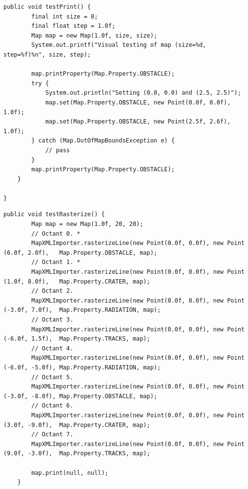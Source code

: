 \documentclass[12pt,a4paper]{article}
\begin{document}
     \begin{lstlisting}[caption=Map automated test suite 3, captionpos=b, label={lst:MapAutomatedTestSuite3}]
      public void testPrint() {
        final int size = 8;
        final float step = 1.0f;
        Map map = new Map(1.0f, size, size);
        System.out.printf("Visual testing of map (size=%d, step=%f)%n", size, step);
        
        map.printProperty(Map.Property.OBSTACLE);
        try {
            System.out.println("Setting (0.0, 0.0) and (2.5, 2.5)");
            map.set(Map.Property.OBSTACLE, new Point(0.0f, 0.0f), 1.0f);
            map.set(Map.Property.OBSTACLE, new Point(2.5f, 2.6f), 1.0f);
        } catch (Map.OutOfMapBoundsException e) {
            // pass
        }
        map.printProperty(Map.Property.OBSTACLE);
    }

}
     \end{lstlisting}
     
     \begin{lstlisting}[caption=MapXMLImporter automated test suite 1, captionpos=b, label={lst:MapXMLImporterAutomatedTestSuite1}]
     public void testRasterize() {
        Map map = new Map(1.0f, 20, 20);
        // Octant 0. *
        MapXMLImporter.rasterizeLine(new Point(0.0f, 0.0f), new Point (6.0f, 2.0f),   Map.Property.OBSTACLE, map);
        // Octant 1. *
        MapXMLImporter.rasterizeLine(new Point(0.0f, 0.0f), new Point (1.0f, 8.0f),   Map.Property.CRATER, map);
        // Octant 2.
        MapXMLImporter.rasterizeLine(new Point(0.0f, 0.0f), new Point (-3.0f, 7.0f),  Map.Property.RADIATION, map);
        // Octant 3.
        MapXMLImporter.rasterizeLine(new Point(0.0f, 0.0f), new Point (-6.0f, 1.5f),  Map.Property.TRACKS, map);
        // Octant 4.
        MapXMLImporter.rasterizeLine(new Point(0.0f, 0.0f), new Point (-6.0f, -5.0f), Map.Property.RADIATION, map);
        // Octant 5.
        MapXMLImporter.rasterizeLine(new Point(0.0f, 0.0f), new Point (-3.0f, -8.0f), Map.Property.OBSTACLE, map);
        // Octant 6.
        MapXMLImporter.rasterizeLine(new Point(0.0f, 0.0f), new Point (3.0f, -9.0f),  Map.Property.CRATER, map);
        // Octant 7.
        MapXMLImporter.rasterizeLine(new Point(0.0f, 0.0f), new Point (9.0f, -3.0f),  Map.Property.TRACKS, map);
        
        map.print(null, null);
    }
     \end{lstlisting}
     
\end{document}
